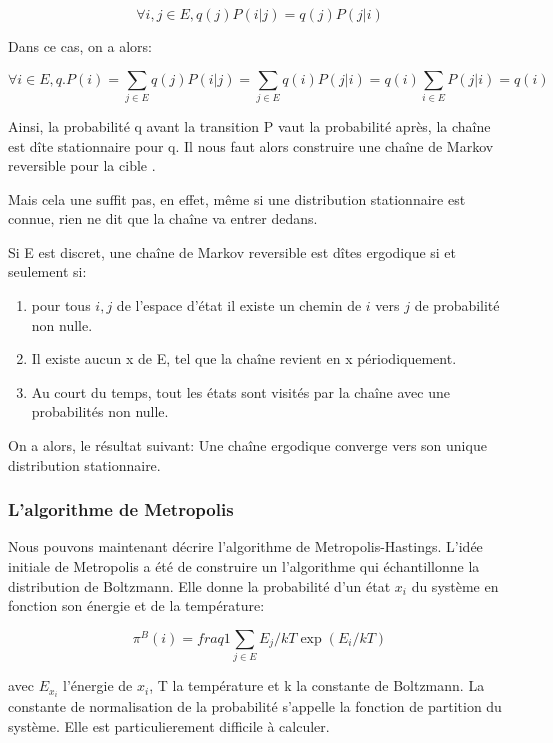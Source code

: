 \begin{equation}
\forall i,j \in E, q(j)P(i|j)=q(j)P(j|i)
\end{equation}

Dans ce cas, on a alors:

\begin{equation}
\forall i \in E, q.P (i) = \sum_{j \in E} q(j)P(i|j) = \sum_{j \in E} q(i)P(j|i) = q(i) \sum_{i \in E}P(j|i) = q(i)
\end{equation}

Ainsi, la probabilité q avant la transition P vaut la probabilité après, la chaîne est dîte stationnaire pour q. Il nous faut alors construire une chaîne de Markov reversible pour la cible \pi.

Mais cela une suffit pas, en effet, même si une distribution stationnaire est connue, rien ne dit que la chaîne va entrer dedans. 

Si E est discret, une chaîne de Markov reversible est dîtes ergodique si et seulement si:

\begin{enumerate}
  \label{crit_ergo}
\item pour tous $i, j$ de l'espace d'état il existe un chemin de   $i$  vers   $j$  de probabilité non nulle. 
\item Il existe aucun x de E, tel que la chaîne revient en x périodiquement.
\item  Au court du temps, tout les états sont visités par la chaîne avec une probabilités non nulle. 
\end{enumerate}

On a alors, le résultat suivant:
Une chaîne ergodique converge vers son unique distribution stationnaire.

\subsubsection{L'algorithme de Metropolis}

Nous pouvons maintenant décrire l'algorithme de Metropolis-Hastings. L'idée initiale de Metropolis a été de construire un l'algorithme qui échantillonne la distribution de Boltzmann. Elle donne la probabilité d'un état $x_i$ du système en fonction son énergie et de la température:


\begin{equation}
\pi^B(i) = fraq{1}{\sum_{j \in E}E_j/kT} \exp(E_i/kT)
\end{equation}

avec $E_{x_i}$  l'énergie de $x_i$, T la température et k la constante de Boltzmann. La constante de normalisation de la probabilité s'appelle la fonction de partition du système. Elle est particulierement difficile à calculer.

